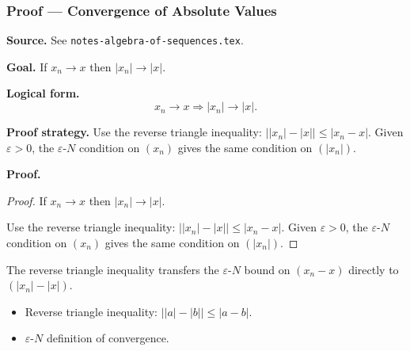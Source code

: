 
\clearpage
{}
\hypertarget{proof-RA-ABB-C-abs-value-limit}{}

\subsubsection[Convergence of Absolute Values]{Proof --- Convergence of Absolute Values}

\bigskip

\noindent
\textbf{Source.}
See \texttt{notes-algebra-of-sequences.tex}.

\vspace{0.75em}

\noindent
\textbf{Goal.}
If $x_n \to x$ then $|x_n| \to |x|$.

\vspace{0.75em}

\noindent
\textbf{Logical form.}
\[
  x_n \to x \Rightarrow |x_n| \to |x|.
\]

\vspace{0.75em}

\noindent
\textbf{Proof strategy.}
Use the reverse triangle inequality: $\bigl||x_n| - |x|\bigr| \le |x_n - x|$. Given $\varepsilon > 0$, the $\varepsilon$-$N$ condition on $(x_n)$ gives the same condition on $(|x_n|)$.

\vspace{0.75em}

\noindent
\textbf{Proof.}
\begin{proof}
\Claim If $x_n \to x$ then $|x_n| \to |x|$.

\Given 

\Goal 

\Strategy Use the reverse triangle inequality: $\bigl||x_n| - |x|\bigr| \le |x_n - x|$. Given $\varepsilon > 0$, the $\varepsilon$-$N$ condition on $(x_n)$ gives the same condition on $(|x_n|)$.

\medskip


\end{proof}

\begin{remark*}
The reverse triangle inequality transfers the $\varepsilon$-$N$ bound on $(x_n - x)$ directly to $(|x_n| - |x|)$.
\end{remark*}

\begin{remark*}[Dependencies]
\begin{itemize}
  \item Reverse triangle inequality: $\bigl||a| - |b|\bigr| \le |a - b|$.
  \item $\varepsilon$-$N$ definition of convergence.
\end{itemize}
\end{remark*}
